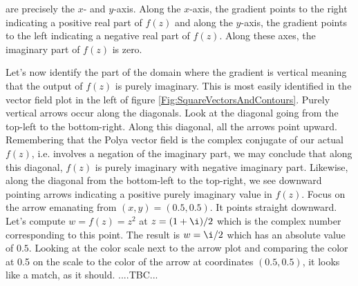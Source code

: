 \documentclass[12pt]{article}
\begin{document}
are precisely the $x$- and $y$-axis. Along the $x$-axis, the gradient points to the right indicating a positive real part of $f(z)$ and along the $y$-axis, the gradient points to the left indicating a negative real part of $f(z)$. Along these axes, the imaginary part of $f(z)$ is zero. 

\medskip
Let's now identify the part of the domain where the gradient is vertical meaning that the output of $f(z)$ is purely imaginary. This is most easily identified in the vector field plot in the left of figure \ref{Fig:SquareVectorsAndContours}. Purely vertical arrows occur along the diagonals. Look at the diagonal going from the top-left to the bottom-right. Along this diagonal, all the arrows point upward. Remembering that the Polya vector field is the complex conjugate of our actual $f(z)$, i.e. involves a negation of the imaginary part, we may conclude that along this diagonal, $f(z)$ is purely imaginary with negative imaginary part. Likewise, along the diagonal from the bottom-left to the top-right, we see downward pointing arrows indicating a positive purely imaginary value in $f(z)$. Focus on the arrow emanating from $(x,y) = (0.5,0.5)$. It points straight downward. Let's compute $w = f(z) = z^2$ at $z = (1 + \i) / 2$ which is the complex number corresponding to this point. The result is $w = \i / 2$ which has an absolute value of $0.5$. Looking at the color scale next to the arrow plot and comparing the color at 0.5 on the scale to the color of the arrow at coordinates $(0.5,0.5)$, it looks like a match, as it should. ....TBC...
\end{document}
